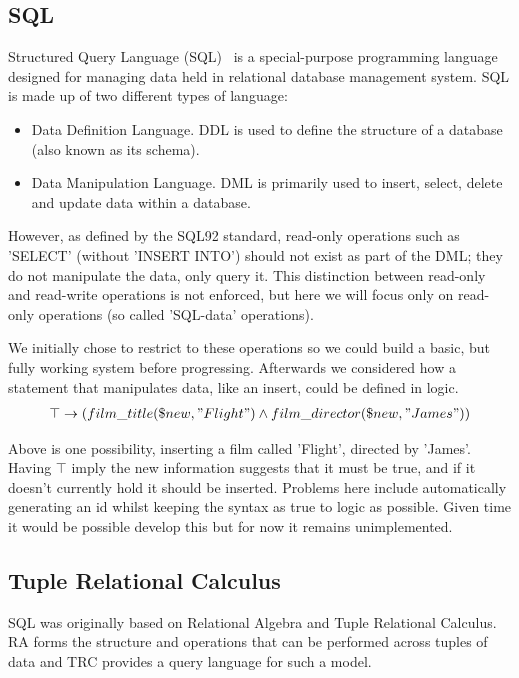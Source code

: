 \documentclass[a4paper, 11pt]{article}
\begin{document}
\subsection{SQL}
  Structured Query Language (SQL)~\cite{wiki:SQL} is a special-purpose
  programming language designed for managing data held in relational database
  management system. SQL is made up of two different types of language:

  \begin{itemize}
      \item
        Data Definition Language. DDL is used to define the structure of a
        database (also known as its schema).
      \item
        Data Manipulation Language. DML is primarily used to insert, select,
        delete and update data within a database.
  \end{itemize}

  However, as defined by the SQL92 standard\cite{isoSQL}, read-only operations
  such as 'SELECT' (without 'INSERT INTO') should not exist as part of the DML;
  they do not manipulate the data, only query it. This distinction between
  read-only and read-write operations is not enforced, but here we will focus
  only on read-only operations (so called 'SQL-data' operations).

  We initially chose to restrict to these operations so we could build a basic,
  but fully working system before progressing. Afterwards we considered how
  a statement that manipulates data, like an insert, could be defined in logic.
  \begin{gather}
    \top \rightarrow (film\_title(\$new, "Flight") \land film\_director(\$new, "James"))
  \end{gather}

  Above is one possibility, inserting a film called 'Flight', directed by 
  'James'. Having $\top$ imply the new information suggests that it must be 
  true, and if it doesn't currently hold it should be inserted. Problems here
  include automatically generating an id whilst keeping the syntax as true to
  logic as possible. Given time it would be possible develop this but for now
  it remains unimplemented.

\subsection{Tuple Relational Calculus}
  SQL was originally based on Relational Algebra and Tuple Relational
  Calculus. RA forms the structure and operations that can be performed
  across tuples of data and TRC provides a query language for such a model.
\end{document}
